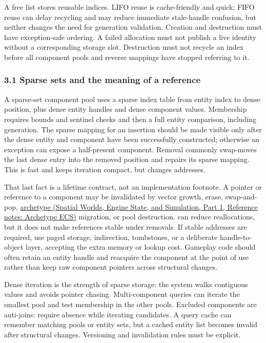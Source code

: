 A free list stores reusable indices. LIFO reuse is cache-friendly and quick; FIFO reuse can delay recycling and may reduce immediate stale-handle confusion, but neither changes the need for generation validation. Creation and destruction must have exception-safe ordering. A failed allocation must not publish a live identity without a corresponding storage slot. Destruction must not recycle an index before all component pools and reverse mappings have stopped referring to it.

\subsubsection{3.1 Sparse sets and the meaning of a reference}\label{05-engine-i-ch008-sparse-sets-and-the-meaning-of-a-reference}

\hypertarget{05-engine-i-ch008-sparse-sets-and-the-meaning-of-a-reference}{}

A sparse-set component pool uses a sparse index table from entity index to dense position, plus dense entity handles and dense component values. Membership requires bounds and sentinel checks and then a full entity comparison, including generation. The sparse mapping for an insertion should be made visible only after the dense entity and component have been successfully constructed; otherwise an exception can expose a half-present component. Removal commonly swap-moves the last dense entry into the removed position and repairs its sparse mapping. This is fast and keeps iteration compact, but changes addresses.

That last fact is a lifetime contract, not an implementation footnote. A pointer or reference to a component may be invalidated by vector growth, erase, swap-and-pop, \href{../05-Spatial-Worlds-Engine-State-and-Simulation-P01/main.pdf\#nameddest=appendix-fbfeb0430008}{archetype (Spatial Worlds, Engine State, and Simulation, Part 1, Reference notes: Archetype ECS)} migration, or pool destruction.  can reduce reallocations, but it does not make references stable under removals. If stable addresses are required, use paged storage, indirection, tombstones, or a deliberate handle-to-object layer, accepting the extra memory or lookup cost. Gameplay code should often retain an entity handle and reacquire the component at the point of use rather than keep raw component pointers across structural changes.

Dense iteration is the strength of sparse storage: the system walks contiguous values and avoids pointer chasing. Multi-component queries can iterate the smallest pool and test membership in the other pools. Excluded components are anti-joins: require absence while iterating candidates. A query cache can remember matching pools or entity sets, but a cached entity list becomes invalid after structural changes. Versioning and invalidation rules must be explicit.

